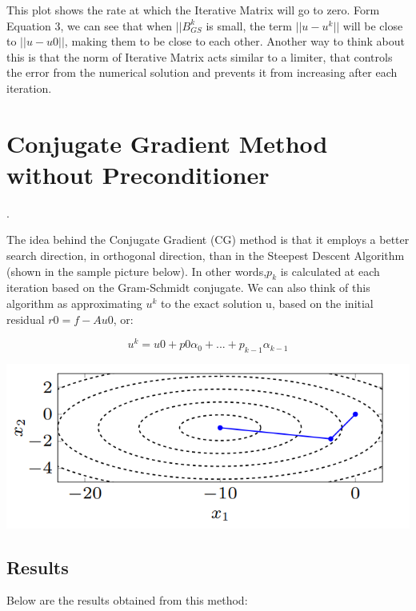 \documentclass{article}
\begin{document}
\noindent
This plot shows the rate at which the Iterative Matrix will go to zero. Form Equation 3, we can see that when $||B_{GS}^k$ is small, the term $||u-u^k||$ will be close to $||u-u0||$, making them to be close to each other. Another way to think about this is that the norm of Iterative Matrix acts similar to a limiter, that controls the error from the numerical solution and prevents it from increasing after each iteration.  


\section{Conjugate Gradient Method without Preconditioner}.  

\noindent
The idea behind the Conjugate Gradient (CG) method is that it employs a better search direction, in orthogonal direction, than in the Steepest Descent Algorithm (shown in the sample picture below). In other words,$p_k$ is calculated at each iteration based on the Gram-Schmidt conjugate. We can also think of this algorithm as approximating $u^k$ to the exact solution u, based on the initial residual $r0 = f-Au0$, or: 

\begin{equation*}
	u^k = u0+p0\alpha_0+...+p_{k-1}\alpha_{k-1}
\end{equation*}
\begin{center}
	\includegraphics[scale=0.5]{search.png}
\end{center}

\subsection{Results}

Below are the results obtained from this method: 
\end{document}
